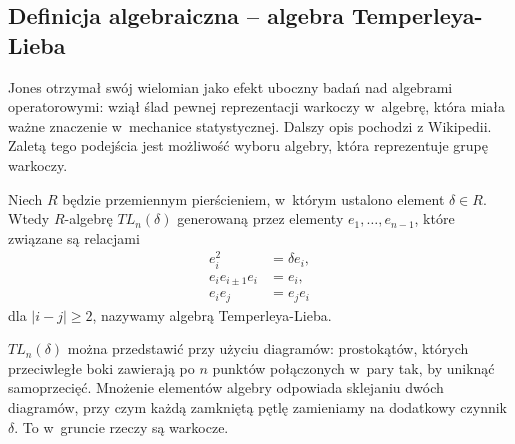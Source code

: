 \subsection{Definicja algebraiczna -- algebra Temperleya-Lieba} %

Jones otrzymał swój wielomian jako efekt uboczny badań nad algebrami operatorowymi: wziął ślad pewnej reprezentacji warkoczy w~algebrę, która miała ważne znaczenie w~mechanice statystycznej.
Dalszy opis pochodzi z Wikipedii.
Zaletą tego podejścia jest możliwość wyboru algebry, która reprezentuje grupę warkoczy.

\begin{definition}
    Niech $R$ będzie przemiennym pierścieniem, w~którym ustalono element $\delta \in R$.
    Wtedy $R$-algebrę $TL_n(\delta)$ generowaną przez elementy $e_1, \ldots, e_{n-1}$, które związane są relacjami
    \begin{align}
        e_i^2 & = \delta e_i, \\
        e_i e_{i \pm 1} e_i & = e_i, \\
        e_i e_j & = e_j e_i
    \end{align}
    dla $|i-j| \ge 2$, nazywamy algebrą Temperleya-Lieba.
\end{definition}

$TL_n(\delta)$ można przedstawić przy użyciu diagramów: prostokątów, których przeciwległe boki zawierają po $n$ punktów połączonych w~pary tak, by uniknąć samoprzecięć.
Mnożenie elementów algebry odpowiada sklejaniu dwóch diagramów, przy czym każdą zamkniętą pętlę zamieniamy na dodatkowy czynnik $\delta$.
To w~gruncie rzeczy są warkocze.

